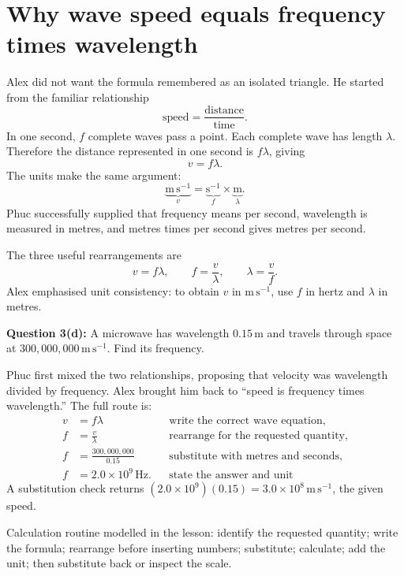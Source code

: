 \documentclass[11pt,a4paper]{article}
\newcommand{\key}[1]{\begin{keybox}#1\end{keybox}}
\begin{document}
\section{Why wave speed equals frequency times wavelength}
Alex did not want the formula remembered as an isolated triangle. He started from the familiar relationship
\[
\text{speed}=\frac{\text{distance}}{\text{time}}.
\]
In one second, $f$ complete waves pass a point. Each complete wave has length $\lambda$. Therefore the distance represented in one second is $f\lambda$, giving
\[
\boxed{v=f\lambda}.
\]
The units make the same argument:
\[
\underbrace{\mathrm{m\,s^{-1}}}_{v}
=\underbrace{\mathrm{s^{-1}}}_{f}\times\underbrace{\mathrm{m}}_{\lambda}.
\]
Phuc successfully supplied that frequency means per second, wavelength is measured in metres, and metres times per second gives metres per second.

The three useful rearrangements are
\[
v=f\lambda,\qquad f=\frac{v}{\lambda},\qquad \lambda=\frac{v}{f}.
\]
Alex emphasised unit consistency: to obtain $v$ in $\mathrm{m\,s^{-1}}$, use $f$ in hertz and $\lambda$ in metres.

\begin{examplebox}[title=\textbf{Lesson calculation: microwave frequency}]
\textbf{Question 3(d):} A microwave has wavelength $0.15\,\mathrm{m}$ and travels through space at $300{,}000{,}000\,\mathrm{m\,s^{-1}}$. Find its frequency.

Phuc first mixed the two relationships, proposing that velocity was wavelength divided by frequency. Alex brought him back to ``speed is frequency times wavelength.'' The full route is:
\begin{align*}
v&=f\lambda &&\text{write the correct wave equation},\\
f&=\frac{v}{\lambda} &&\text{rearrange for the requested quantity},\\
f&=\frac{300{,}000{,}000}{0.15} &&\text{substitute with metres and seconds},\\
f&=2.0\times10^9\,\mathrm{Hz}. &&\text{state the answer and unit}
\end{align*}
A substitution check returns $(2.0\times10^9)(0.15)=3.0\times10^8\,\mathrm{m\,s^{-1}}$, the given speed.
\end{examplebox}

\key{Calculation routine modelled in the lesson: identify the requested quantity; write the formula; rearrange before inserting numbers; substitute; calculate; add the unit; then substitute back or inspect the scale.}
\end{document}
